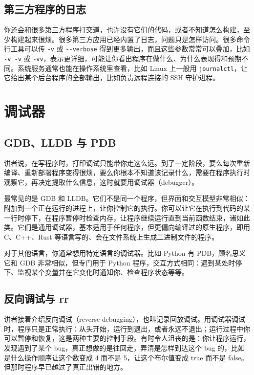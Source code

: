 \documentclass[a4paper]{article}
\begin{document}
\subsection{第三方程序的日志}

你还会和很多第三方程序打交道，也许没有它们的代码，或者不知道怎么构建，至少构建起来很烦。很多第三方应用已经内置了日志，问题只是怎样访问。很多命令行工具可以传 \texttt{-v} 或 \texttt{-{}-verbose} 得到更多输出，而且这些参数常常可以叠加，比如 \texttt{-v -v} 或 \texttt{-vv}，表示更详细，可能让你看出程序在做什么、为什么表现得和预期不同。系统服务通常也能在操作系统里查看，比如 Linux 上一般用 \texttt{journalctl}，让它给出某个后台程序的全部输出，比如负责远程连接的 SSH 守护进程。

\section{调试器}

\subsection{GDB、LLDB 与 PDB}

讲者说，在写程序时，打印调试只能带你走这么远。到了一定阶段，要么每次重新编译、重新部署程序变得很烦，要么你根本不知道该记录什么，需要在程序执行时观察它，再决定提取什么信息，这时就要用调试器（debugger）。

最常见的是 GDB 和 LLDB。它们不是同一个程序，但界面和交互模型非常相似：附加到一个正在运行的进程上，让你控制它的执行。你可以让它在执行到代码的某一行时停下，在程序暂停时检查内存，让程序继续运行直到当前函数结束，诸如此类。它们是通用调试器，基本适用于任何程序，但更偏向编译过的原生程序，即用 C、C++、Rust 等语言写的、会在文件系统上生成二进制文件的程序。

对于其他语言，你通常想用特定语言的调试器。比如 Python 有 PDB，顾名思义它和 GDB 非常相似，但专门用于 Python 程序，交互方式相同：遇到某处时停下、监视某个变量并在它变化时通知你、检查程序状态等等。

\subsection{反向调试与 rr}

讲者接着介绍反向调试（reverse debugging），也叫记录回放调试。用调试器调试时，程序只是正常执行：从头开始，运行到退出，或者永远不退出；运行过程中你可以暂停和恢复，这是两种主要的控制手段。有时令人沮丧的是：你让程序运行，发现遇到了某个 bug，真正想做的是往回走，弄清是怎样到达这个 bug 的，比如是什么操作顺序让这个数变成 4 而不是 5，让这个布尔值变成 true 而不是 false。但那时程序早已越过了真正出错的地方。
\end{document}
